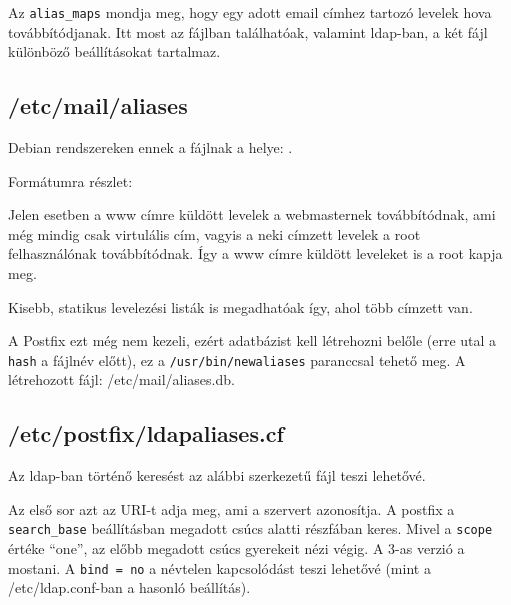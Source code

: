 Az \texttt{alias\_maps} mondja meg, hogy egy adott email címhez tartozó levelek hova továbbítódjanak. Itt most az
 fájlban találhatóak, valamint ldap-ban, a két fájl különböző beállításokat tartalmaz.

\subsection{/etc/mail/aliases}
Debian rendszereken ennek a fájlnak a helye: .

Formátumra részlet:\\

Jelen esetben a www címre küldött levelek a webmasternek továbbítódnak, ami még mindig csak virtulális cím, vagyis a
neki címzett levelek a root felhasználónak továbbítódnak. Így a www címre küldött leveleket is a root kapja meg.

Kisebb, statikus levelezési listák is megadhatóak így, ahol több címzett van.

A Postfix ezt még nem kezeli, ezért adatbázist kell létrehozni belőle (erre utal a \texttt{hash} a fájlnév előtt), ez
a \texttt{/usr/bin/newaliases} paranccsal tehető meg. A létrehozott fájl: /etc/mail/aliases.db.



\subsection{/etc/postfix/ldapaliases.cf}
Az ldap-ban történő keresést az alábbi szerkezetű fájl teszi lehetővé.


Az első sor azt az URI-t adja meg, ami a szervert azonosítja. A postfix a \texttt{search\_base} beállításban megadott
csúcs alatti részfában keres. Mivel a \texttt{scope} értéke ``one'', az előbb megadott csúcs gyerekeit nézi végig. A
3-as verzió  a mostani. A \texttt{bind = no} a névtelen kapcsolódást teszi lehetővé (mint a /etc/ldap.conf-ban a
hasonló beállítás).

